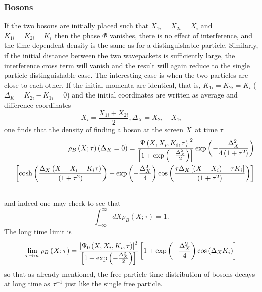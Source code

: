 \documentclass[preprint,aps]{revtex4}
\begin{document}
\subsubsection{\protect\bigskip Bosons}

If the two bosons are initially placed such that $X_{1i}=X_{2i}=X_{i}$ and $%
K_{1i}=K_{2i}=K_{i}$ then the phase $\Phi $ vanishes, there is no effect of
interference, and the time dependent density is the same as for a
distinguishable particle. Similarly, if the initial distance between the two
wavepackets is sufficiently large, the interference cross term will vanish and the
result will again reduce to the single particle distinguishable case. The
interesting case is when the two particles are close to each other. If the
initial momenta are identical, that is, $K_{1i}=K_{2i}=K_{i}$ ($\Delta_{K}=K_{2i}-K_{1i}=0$) and the initial coordinates are written as average and difference coordinates
\begin{equation}
X_{i}=\frac{X_{1i}+X_{2i}}{2},\Delta _{X}=X_{2i}-X_{1i}  \label{2.17}
\end{equation}%
one finds that the density of finding a boson at the screen $X$\ at time $%
\tau $\
\begin{eqnarray}
&&\rho _{B}\left( X;\tau \right) \left( \Delta _{K}=0\right) =\frac{%
\left\vert \Psi \left( X,X_{i},K_{i},\tau \right) \right\vert ^{2}}{\left[
1+\exp \left( -\frac{\Delta _{X}^{2}}{2}\right) \right] }\exp \left( -\frac{%
\Delta _{X}^{2}}{4\left( 1+\tau ^{2}\right) }\right)  \notag \\
&&\left[ \cosh \left( \frac{\Delta _{X}\left( X-X_{i}-K_{i}\tau \right) }{%
\left( 1+\tau ^{2}\right) }\right) +\exp \left( -\frac{\Delta _{X}^{2}}{4}%
\right) \cos \left( \frac{\tau \Delta _{X}\left[ \left( X-X_{i}\right) -\tau
K_{i}\right] }{\left( 1+\tau ^{2}\right) }\right) \right]  \notag \\
&&  \label{2.18}
\end{eqnarray}%
and indeed one may check to see that%
\begin{equation}
\int_{-\infty }^{\infty }dX\rho _{B}\left( X;\tau \right) =1.  \label{2.19}
\end{equation}%
The long time limit is%
\begin{equation}
\lim_{\tau \rightarrow \infty }\rho _{B}\left( X;\tau \right) =\frac{%
\left\vert \Psi _{0}\left( X,X_{i},K_{i},\tau \right) \right\vert ^{2}}{%
\left[ 1+\exp \left( -\frac{\Delta _{X}^{2}}{2}\right) \right] }\left[
1+\exp \left( -\frac{\Delta _{X}^{2}}{4}\right) \cos \left( \Delta
_{X}K_{i}\right) \right]  \label{2.20}
\end{equation}%
so that as already mentioned, the free-particle time distribution of bosons
decays at long time as $\tau ^{-1}$ just like the single 
free particle.
\end{document}
